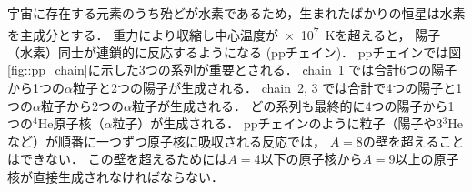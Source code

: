 \documentclass[../master]{subfiles}
\begin{document}
宇宙に存在する元素のうち殆どが水素であるため，生まれたばかりの恒星は水素を主成分とする．
重力により収縮し中心温度が\SI{e7}{\kelvin}を超えると，
陽子（水素）同士が連鎖的に反応するようになる (ppチェイン)．
ppチェインでは図\ref{fig::pp_chain}に示した3つの系列が重要とされる．
chain~1 では合計6つの陽子から1つの$\alpha$粒子と2つの陽子が生成される．
chain~2, 3 では合計で4つの陽子と1つの$\alpha$粒子から2つの$\alpha$粒子が生成される．
どの系列も最終的に4つの陽子から1つの${}^{4}\mathrm{He}$原子核（$\alpha$粒子）が生成される．
ppチェインのように粒子（陽子や$3{}^{3}\mathrm{He}$など）が順番に一つずつ原子核に吸収される反応では，
$A = $8の壁を超えることはできない．
この壁を超えるためには$A = $4以下の原子核から$A = $9以上の原子核が直接生成されなければならない．
\end{document}
